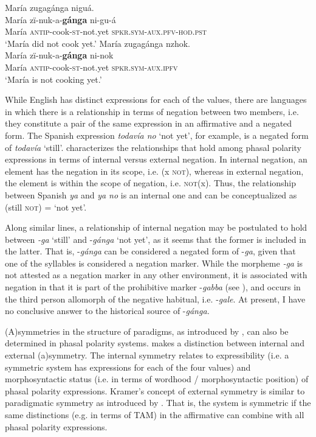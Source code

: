 \documentclass[output=paper,colorlinks,citecolor=brown]{langscibook}
\begin{document}
\ea\label{ex:kog:26}
    \ea\label{ex:kog:26a}María zugagánga niguá.\\
        \gll  María zï-nuk{}-a-\textbf{gánga} ni-gu-á\\ 
              María \textsc{antip-}cook\textsc{{}-st}{}-not.yet \textsc{spkr.sym-aux.pfv}{}-\textsc{hod.pst}\\
        \glt ‘María did not cook yet.’
    \ex\label{ex:kog:26b}María zugagánga nzhok.\\
        \gll  María zï-nuk-a{}-\textbf{gánga} ni-nok\\
              María \textsc{antip-}cook\textsc{{}-st}{}-not.yet \textsc{spkr.sym-aux.ipfv}\\
        \glt ‘María is not cooking yet.’
    \z
\z 

While English has distinct expressions for each of the values, there are languages in which there is a relationship in terms of negation between two members, i.e. they constitute a pair of the same expression in an affirmative and a negated form. The Spanish expression \textit{todavía no} ‘not yet’, for example, is a negated form of \textit{todavía} ‘still’. \citet{Löbner1989} characterizes the relationships that hold among phasal polarity expressions in terms of internal versus external negation. In internal negation, an element has the negation in its scope, i.e. (x \textsc{not),} whereas in external negation, the element is within the scope of negation, i.e. \textsc{not(}x). Thus, the relationship between Spanish \textit{ya} and \textit{ya no} is an internal one and can be conceptualized as (still \textsc{not)} \textsc{=} \textsc{‘}not yet’. 

Along similar lines, a relationship of internal negation may be postulated to hold between \textit{{}-ga} ‘still’ and -\textit{g\'{a}nga} ‘not yet’, as it seems that the former is included in the latter. That is, -\textit{g\'{a}nga} can be considered a negated form of {}-\textit{ga}, given that one of the syllables is considered a negation marker. While the morpheme \textit{{}-ga} is not attested as a negation marker in any other environment, it is associated with negation in that it is part of the prohibitive marker -\textit{gabba} (see ), and occurs in the third person allomorph of the negative habitual, i.e. -\textit{gale}. At present, I have no conclusive answer to the historical source of -\textit{gánga.}

(A)symmetries in the structure of paradigms, as introduced by \citet{Miestamo2005}, can also be determined in phasal polarity systems. \citet[16--19]{Kramer2017} makes a distinction between internal and external (a)symmetry. The internal symmetry relates to expressibility (i.e. a symmetric system has expressions for each of the four values) and morphosyntactic status (i.e. in terms of wordhood / morphosyntactic position) of phasal polarity expressions. Kramer’s concept of external symmetry is similar to paradigmatic symmetry as introduced by \citet{Miestamo2005}. That is, the system is symmetric if the same distinctions (e.g. in terms of TAM) in the affirmative can combine with all phasal polarity expressions.
\end{document}
